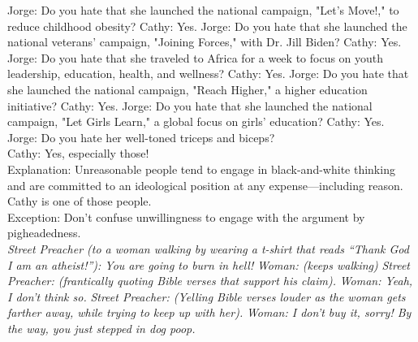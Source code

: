 \documentclass[a4paper,12pt,single,pdftex]{scrbook}
\begin{document}
    
      Jorge: Do you hate that she launched the national campaign, "Let's Move!," to reduce childhood obesity? \newline
Cathy: Yes. \newline
Jorge: Do you hate that she launched the national veterans' campaign, "Joining Forces," with Dr. Jill Biden? \newline
Cathy: Yes. \newline
Jorge: Do you hate that she traveled to Africa for a week to focus on youth leadership, education, health, and wellness? \newline
Cathy: Yes. \newline
Jorge: Do you hate that she launched the national campaign, "Reach Higher," a higher education initiative? \newline
Cathy: Yes. \newline
Jorge: Do you hate that she launched the national campaign, "Let Girls Learn," a global focus on girls' education? \newline
Cathy: Yes.
    \\

    
      Jorge: Do you hate her well-toned triceps and biceps?
    \\

    
      Cathy: Yes, especially those!
    \\

    
      Explanation: Unreasonable people tend to engage in black-and-white thinking and are committed to an ideological position at any expense—including reason. Cathy is one of those people.
    \\

    
      Exception: Don’t confuse unwillingness to engage with the argument by pigheadedness.
    \\

    
      {\em Street Preacher (to a woman walking by wearing a t-shirt that reads “Thank God I am an atheist!”): You are going to burn in hell!} \newline
{\em Woman: (keeps walking)} \newline
{\em Street Preacher: (frantically quoting Bible verses that support his claim).} \newline
{\em Woman: Yeah, I don’t think so.} \newline
{\em Street Preacher: (Yelling Bible verses louder as the woman gets farther away, while trying to keep up with her).} \newline
{\em Woman: I don’t buy it, sorry! By the way, you just stepped in dog poop.}
    \\
\end{document}
